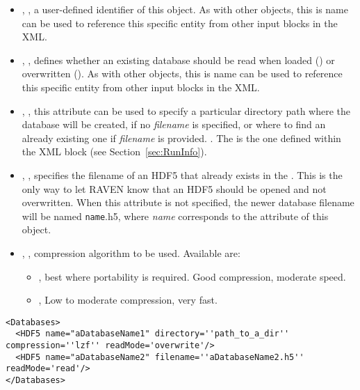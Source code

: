 \begin{itemize}
  \itemsep0em
  \item {}, , a user-defined
  identifier of this object.
  \nb As with other objects, this is name can be used to reference this specific
  entity from other input blocks in the XML.
  \item {}, , defines whether an existing database should
    be read when loaded () or overwritten ().
  \nb As with other objects, this is name can be used to reference this specific
  entity from other input blocks in the XML.
  \item {}, , this attribute
  can be used to specify a particular directory path where the database will be
  created, if no \textit{filename} is specified, or where to find an already
  existing one if \textit{filename} is provided.
  .  The  is
   the one defined within the  XML block (see Section~\ref{sec:RunInfo}).
  \item {}, , specifies the
  filename of an HDF5 that already exists in the .
  This is the only way to let RAVEN know that an HDF5 should be opened and not
  overwritten.
  \nb When this attribute is not specified, the newer database filename will be
  named \texttt{name}.h5, where \textit{name} corresponds to the 
  attribute of this object.
  \item {}, , compression
  algorithm to be used.
  Available are:
  \begin{itemize}
    \item {}, best where portability is required.
    Good compression, moderate speed.
    \item {}, Low to moderate compression, very fast.
  \end{itemize}
\end{itemize}

\begin{lstlisting}[style=XML,morekeywords={directory,filename}]
<Databases>
  <HDF5 name="aDatabaseName1" directory=''path_to_a_dir'' compression=''lzf'' readMode='overwrite'/>
  <HDF5 name="aDatabaseName2" filename=''aDatabaseName2.h5'' readMode='read'/>
</Databases>
\end{lstlisting}
